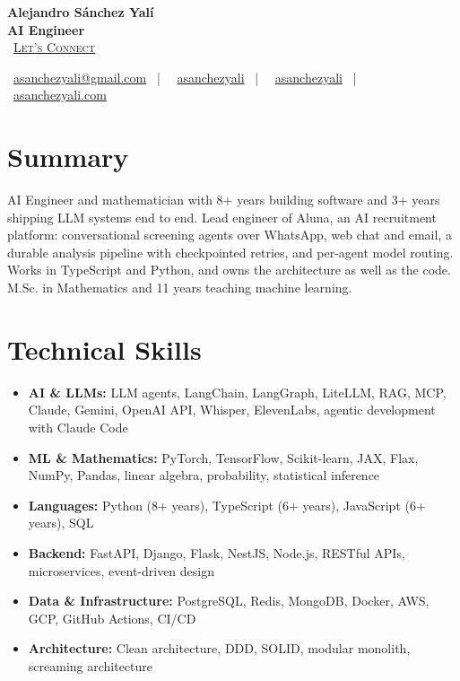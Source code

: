 \documentclass[letterpaper,10pt]{article}
\newcommand{\normalfaCalendar}{{\mdseries\faCalendar}}
\newcommand{\normalfaEnvelope}{{\mdseries\faEnvelope}}
\newcommand{\normalfaLinkedin}{{\mdseries\faLinkedin}}
\newcommand{\normalfaGithub}{{\mdseries\faGithub}}
\newcommand{\normalfaGlobe}{{\mdseries\faGlobe}}
\begin{document}
\begin{center}
\textbf{\LARGE Alejandro S\'anchez Yal\'i}\\[0.2em]
\textbf{\Large AI Engineer}\\[0.4em]
\small
\normalfaCalendar\ \href{https://cal.com/asanchezyali/full-time-opportunities}{\textsc{Let's Connect}}

\vspace{0.5em}
\normalfaEnvelope\ \href{mailto:asanchezyali@gmail.com}{asanchezyali@gmail.com}  ~|~
\normalfaLinkedin\ \href{https://www.linkedin.com/in/asanchezyali}{asanchezyali} ~|~
\normalfaGithub\ \href{https://github.com/asanchezyali}{asanchezyali}  ~|~
\normalfaGlobe\ \href{https://asanchezyali.com}{asanchezyali.com}
\end{center}


\section{Summary}
AI Engineer and mathematician with 8+ years building software and 3+ years shipping LLM systems end to end. Lead engineer of Aluna, an AI recruitment platform: conversational screening agents over WhatsApp, web chat and email, a durable analysis pipeline with checkpointed retries, and per-agent model routing. Works in TypeScript and Python, and owns the architecture as well as the code. M.Sc. in Mathematics and 11 years teaching machine learning.

\section{Technical Skills}
\begin{itemize}[leftmargin=*, itemsep=0pt]
  \item \textbf{AI \& LLMs:} LLM agents, LangChain, LangGraph, LiteLLM, RAG, MCP, Claude, Gemini, OpenAI API, Whisper, ElevenLabs, agentic development with Claude Code
  \item \textbf{ML \& Mathematics:} PyTorch, TensorFlow, Scikit-learn, JAX, Flax, NumPy, Pandas, linear algebra, probability, statistical inference
  \item \textbf{Languages:} Python (8+ years), TypeScript (6+ years), JavaScript (6+ years), SQL
  \item \textbf{Backend:} FastAPI, Django, Flask, NestJS, Node.js, RESTful APIs, microservices, event-driven design
  \item \textbf{Data \& Infrastructure:} PostgreSQL, Redis, MongoDB, Docker, AWS, GCP, GitHub Actions, CI/CD
  \item \textbf{Architecture:} Clean architecture, DDD, SOLID, modular monolith, screaming architecture
\end{itemize}
\end{document}
